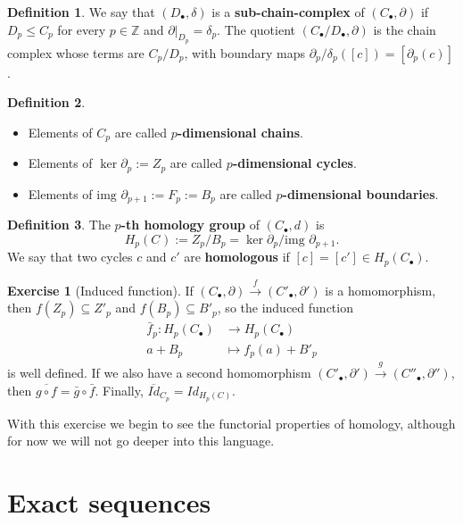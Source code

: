 \documentclass{book}
\theoremstyle{definition}
\newtheorem*{defn}{Definition}
\newtheorem*{ejer}{Exercise}
\begin{document}
\begin{defn}
We say that $(D_\bullet,\delta)$ is a
\textbf{sub-chain-complex} of $(C_\bullet,\partial)$ if
$D_p\leq C_p$ for every $p\in\mathbb Z$ and
$\partial|_{D_p}=\delta_p$. The quotient
$(C_\bullet/D_\bullet,\partial)$ is the chain complex whose
terms are $C_p/D_p$, with boundary maps
$\partial_p/\delta_p([c])=[\partial_p(c)]$.
\end{defn}

\begin{defn}\leavevmode
\begin{itemize}
\item Elements of $C_p$ are called \textbf{$p$-dimensional
chains}.
\item Elements of $\ker\partial_p:=Z_p$ are called
\textbf{$p$-dimensional cycles}.
\item Elements of $\text{img }\partial_{p+1}:=F_p:=B_p$ are
called \textbf{$p$-dimensional boundaries}.
\end{itemize}
\end{defn}

\begin{defn}
The \textbf{$p$-th homology group} of $(C_\bullet,d)$ is
$$
H_p(C_{\dot{}}):=Z_p/B_p
=\ker\partial_p/\text{img }\partial_{p+1}.
$$
We say that two cycles $c$ and $c'$ are \textbf{homologous}
if $[c]=[c']\in H_p(C_\bullet)$.
\end{defn}


\begin{ejer}[Induced function]
If $(C_\bullet,\partial)\xrightarrow f(C'_\bullet,\partial')$
is a homomorphism, then $f(Z_p)\subseteq Z'_p$ and
$f(B_p)\subseteq B'_p$, so the induced function
$$
\begin{aligned}
\bar f_p:H_p(C_\bullet)&\to H_p(C_\bullet)\\
a+B_p&\mapsto f_p(a)+B'_p
\end{aligned}
$$
is well defined. If we also have a second homomorphism
$(C'_\bullet,\partial')\xrightarrow g(C''_\bullet,\partial'')$,
then $\overline{g\circ f}=\bar g\circ\bar f$. Finally,
$\overline{Id}_{C_p}=Id_{H_p(C)}$.
\end{ejer}

With this exercise we begin to see the functorial properties
of homology, although for now we will not go deeper into this
language.

\section{Exact sequences}
\end{document}
